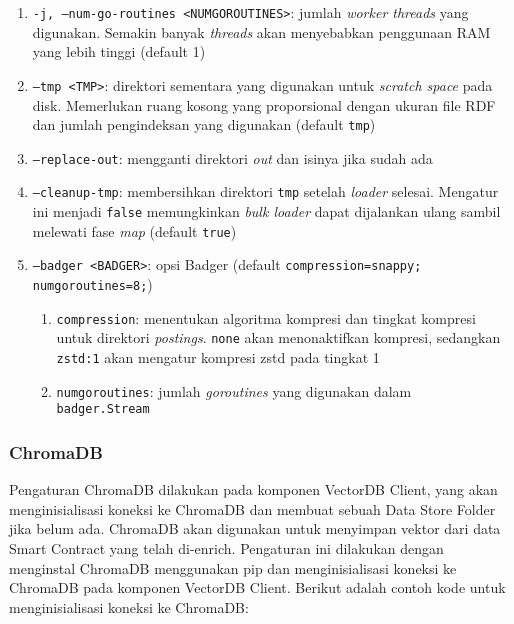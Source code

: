 \begin{enumerate}
\begin{enumerate}
        \item \texttt{-j, --num-go-routines <NUM\textunderscore GO\textunderscore ROUTINES>}: jumlah \textit{worker threads} yang digunakan. Semakin banyak \textit{threads} akan menyebabkan penggunaan RAM yang lebih tinggi (default 1)
        \item \texttt{--tmp <TMP>}: direktori sementara yang digunakan untuk \textit{scratch space} pada disk. Memerlukan ruang kosong yang proporsional dengan ukuran file RDF dan jumlah pengindeksan yang digunakan (default \texttt{tmp})
        \item \texttt{--replace-out}: mengganti direktori \textit{out} dan isinya jika sudah ada
        \item \texttt{--cleanup-tmp}: membersihkan direktori \texttt{tmp} setelah \textit{loader} selesai. Mengatur ini menjadi \texttt{false} memungkinkan \textit{bulk loader} dapat dijalankan ulang sambil melewati fase \textit{map} (default \texttt{true})
        \item \texttt{--badger <BADGER>}: opsi Badger (default \texttt{compression=snappy; numgoroutines=8;})
        \begin{enumerate}
            \item \texttt{compression}: menentukan algoritma kompresi dan tingkat kompresi untuk direktori \textit{postings}. \texttt{none} akan menonaktifkan kompresi, sedangkan \texttt{zstd:1} akan mengatur kompresi zstd pada tingkat 1
            \item \texttt{numgoroutines}: jumlah \textit{goroutines} yang digunakan dalam \\\texttt{badger.Stream}
        \end{enumerate}
    \end{enumerate}
\end{enumerate}


\subsubsection{ChromaDB}

Pengaturan ChromaDB dilakukan pada komponen VectorDB Client, yang akan menginisialisasi koneksi ke ChromaDB dan membuat sebuah Data Store Folder jika belum ada. ChromaDB akan digunakan untuk menyimpan vektor dari data Smart Contract yang telah di-enrich. Pengaturan ini dilakukan dengan menginstal ChromaDB menggunakan pip dan menginisialisasi koneksi ke ChromaDB pada komponen VectorDB Client. Berikut adalah contoh kode untuk menginisialisasi koneksi ke ChromaDB:

